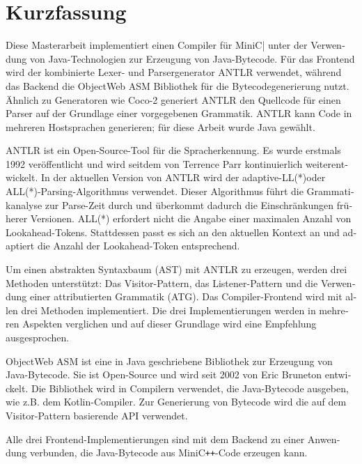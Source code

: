 \chapter{Kurzfassung}


\begin{german}

Diese Masterarbeit implementiert einen Compiler für MiniC\verb++| unter der Verwendung von Java-Technologien zur Erzeugung von Java-Bytecode. Für das Frontend wird der kombinierte Lexer- und Parsergenerator ANTLR verwendet, während das Backend die ObjectWeb ASM Bibliothek für die Bytecodegenerierung nutzt. Ähnlich zu Generatoren wie Coco-2 generiert ANTLR den Quellcode für einen Parser auf der Grundlage einer vorgegebenen Grammatik. ANTLR kann Code in mehreren Hostsprachen generieren; für diese Arbeit wurde Java gewählt. 

ANTLR ist ein Open-Source-Tool für die Spracherkennung. Es wurde erstmals 1992 veröffentlicht und wird seitdem von Terrence Parr kontinuierlich weiterentwickelt. In der aktuellen Version von ANTLR wird der adaptive-LL(*)oder ALL(*)-Parsing-Algorithmus verwendet. Dieser Algorithmus führt die Grammatikanalyse zur Parse-Zeit durch und überkommt dadurch die Einschränkungen früherer Versionen. ALL(*) erfordert nicht die Angabe einer maximalen Anzahl von Lookahead-Tokens. Stattdessen passt es sich an den aktuellen Kontext an und adaptiert die Anzahl der Lookahead-Token entsprechend.

Um einen abstrakten Syntaxbaum (AST) mit ANTLR zu erzeugen, werden drei Methoden unterstützt: Das Visitor-Pattern, das Listener-Pattern und die Verwendung einer attributierten Grammatik (ATG). Das Compiler-Frontend wird mit allen drei Methoden implementiert. Die drei Implementierungen werden in mehreren Aspekten verglichen und auf dieser Grundlage wird eine Empfehlung ausgesprochen.

ObjectWeb ASM ist eine in Java geschriebene Bibliothek zur Erzeugung von Java-Bytecode. Sie ist Open-Source und wird seit 2002 von Eric Bruneton entwickelt. Die Bibliothek wird in Compilern verwendet, die Java-Bytecode ausgeben, wie z.B. dem Kotlin-Compiler. Zur Generierung von Bytecode wird die auf dem Visitor-Pattern basierende API verwendet. 

Alle drei Frontend-Implementierungen sind mit dem Backend zu einer Anwendung verbunden, die Java-Bytecode aus MiniC\verb|++|-Code erzeugen kann. 

\end{german}
